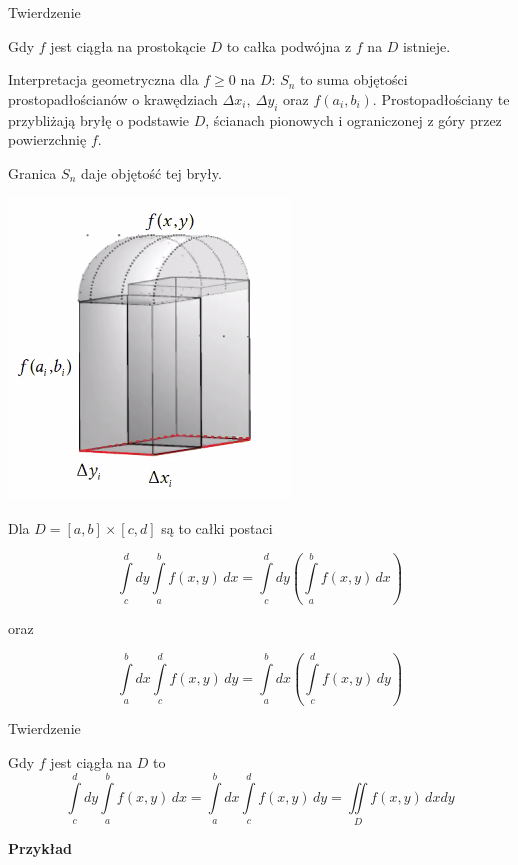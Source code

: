 \begin{tw}{Twierdzenie}

Gdy $f$ jest ciągła na prostokącie $D$ to całka podwójna z $f$ na $D$ istnieje.
\bigskip

Interpretacja geometryczna dla $ f \geq 0 $ na $D$: $S_n$ to suma objętości prostopadłościanów o krawędziach $ \Delta x_i, \ \Delta y_i $ oraz $ f(a_i, b_i) $.
Prostopadłościany te przybliżają bryłę o podstawie $D$, ścianach pionowych i ograniczonej z góry przez powierzchnię $f$.
\end{tw}


Granica $S_n$ daje objętość tej bryły.

\begin{center}
    \includegraphics[scale=0.5]{img/prostowalec.png}
\end{center}

Dla $ D = [a,b] \times [c,d] $ są to całki postaci

\[ \int\limits_c^d dy \int\limits_{a}^{b} f(x,y) \, dx = \int\limits_{c}^{d} dy \left( \int\limits_{a}^{b} f(x,y) \, dx \right) \]
\begin{center}oraz \end{center}
\[ \int\limits_a^b dx \int\limits_{c}^{d} f(x,y) \, dy = \int\limits_{a}^{b} dx \left( \int\limits_{c}^{d} f(x,y) \, dy \right) \]

\begin{tw}{Twierdzenie}

Gdy $f$ jest ciągła na $D$ to
\[ \int\limits_{c}^{d} dy \int\limits_{a}^{b} f(x,y) \, dx = \int\limits_{a}^{b} dx \int\limits_{c}^{d} f(x,y) \, dy = \iint\limits_D f(x,y) \, dxdy \]

\end{tw}

\textbf{Przykład}


